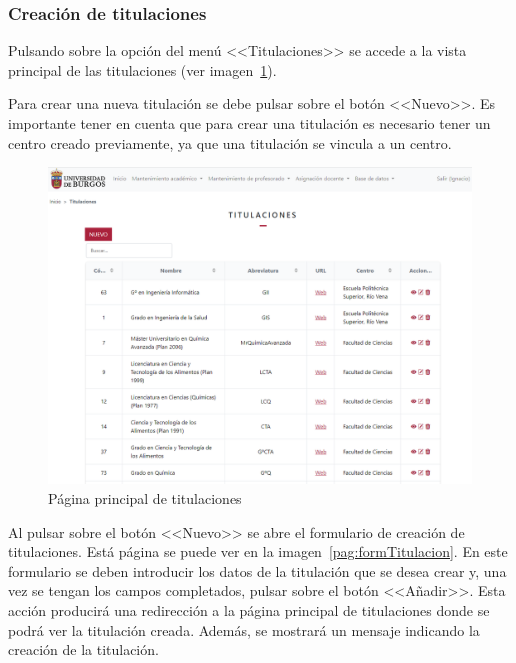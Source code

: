 \subsubsection{Creación de titulaciones}
Pulsando sobre la opción del menú <<Titulaciones>> se accede a la vista principal de las titulaciones (ver imagen~\ref{pag:titulaciones}).

Para crear una nueva titulación se debe pulsar sobre el botón <<Nuevo>>.
Es importante tener en cuenta que para crear una titulación es necesario tener un centro creado previamente, ya que una titulación se vincula a un centro.

\begin{figure}
	\centering
	\includegraphics[width=\textwidth]{../img/Anexos/Manual usuario/titulaciones.png}
	\caption{Página principal de titulaciones}\label{pag:titulaciones}
\end{figure}

Al pulsar sobre el botón <<Nuevo>> se abre el formulario de creación de titulaciones.
Está página se puede ver en la imagen~\ref{pag:formTitulacion}.
En este formulario se deben introducir los datos de la titulación que se desea crear y, una vez se tengan los campos completados, pulsar sobre el botón <<Añadir>>.
Esta acción producirá una redirección a la página principal de titulaciones donde se podrá ver la titulación creada.
Además, se mostrará un mensaje indicando la creación de la titulación.

